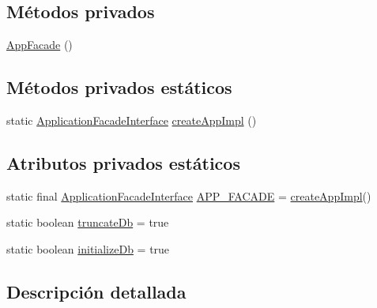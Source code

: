 \subsection*{Métodos privados}
\begin{DoxyCompactItemize}
\item 
\mbox{\hyperlink{classcom_1_1ruralhousejsf_1_1business_logic_1_1_app_facade_a06c4cf71ecdbda8e7abccdd21d84d549}{App\+Facade}} ()
\end{DoxyCompactItemize}
\subsection*{Métodos privados estáticos}
\begin{DoxyCompactItemize}
\item 
static \mbox{\hyperlink{interfacecom_1_1ruralhousejsf_1_1business_logic_1_1_application_facade_interface}{Application\+Facade\+Interface}} \mbox{\hyperlink{classcom_1_1ruralhousejsf_1_1business_logic_1_1_app_facade_a8f4d396c7d2ce6ba084554d68385fc34}{create\+App\+Impl}} ()
\end{DoxyCompactItemize}
\subsection*{Atributos privados estáticos}
\begin{DoxyCompactItemize}
\item 
static final \mbox{\hyperlink{interfacecom_1_1ruralhousejsf_1_1business_logic_1_1_application_facade_interface}{Application\+Facade\+Interface}} \mbox{\hyperlink{classcom_1_1ruralhousejsf_1_1business_logic_1_1_app_facade_a112b5fb14ea720f893a3c52a26a775c9}{A\+P\+P\+\_\+\+F\+A\+C\+A\+DE}} = \mbox{\hyperlink{classcom_1_1ruralhousejsf_1_1business_logic_1_1_app_facade_a8f4d396c7d2ce6ba084554d68385fc34}{create\+App\+Impl}}()
\item 
static boolean \mbox{\hyperlink{classcom_1_1ruralhousejsf_1_1business_logic_1_1_app_facade_ac9cbe77035be5cc1f9bf258c57ca6564}{truncate\+Db}} = true
\item 
static boolean \mbox{\hyperlink{classcom_1_1ruralhousejsf_1_1business_logic_1_1_app_facade_a08e1f188faabf8bef71610c49bdd5d84}{initialize\+Db}} = true
\end{DoxyCompactItemize}


\subsection{Descripción detallada}


